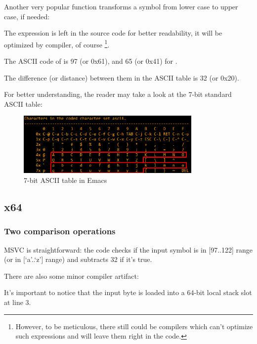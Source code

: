 
Another very popular function transforms a symbol from lower case to upper case, if needed:



The  expression is left in the source code for better readability, it will be 
optimized by compiler, of course
\footnote{However, to be meticulous, there still could be compilers which can't optimize such expressions
and will leave them right in the code.}.

The \ac{ASCII} code of  is 97 (or 0x61), and 65 (or 0x41) for .

The difference (or distance) between them in the \ac{ASCII} table is 32 (or 0x20).

For better understanding, the reader may take a look at the 7-bit standard \ac{ASCII} table:

\begin{figure}[H]
\centering
\includegraphics[width=0.8\textwidth]{ascii.png}
\caption{7-bit \ac{ASCII} table in Emacs}
\end{figure}

\subsection{x64}

\subsubsection{Two comparison operations}

\NonOptimizing MSVC is straightforward: the code checks if the input symbol is in [97..122] range 
(or in [`a'..`z'] range) and subtracts 32 if it's true.

There are also some minor compiler artifact:



It's important to notice that the input byte is loaded into a 64-bit local stack slot at line 3.

